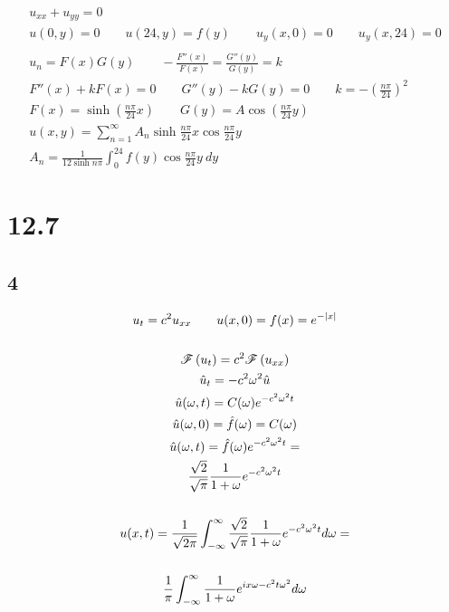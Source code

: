 \begin{gather*}
	u_{xx} + u_{yy} = 0
	\\
	u(0, y) = 0
	\qquad
	u(24, y) = f(y)
	\qquad
	u_y(x, 0) = 0
	\qquad
	u_y(x, 24) = 0
	\\
	\\
	u_n = F(x) G(y)
	\qquad
	-\frac{F''(x)}{F(x)} = \frac{G''(y)}{G(y)} = k
	\\
	F''(x) + k F(x) = 0
	\qquad
	G''(y) - k G(y) = 0
	\qquad
	k = -\left(
		\frac{n \pi}{24}
	\right)^2
	\\
	F(x) = \sinh{\left(\frac{n \pi}{24} x\right)}
	\qquad
	G(y) = A \cos{\left(\frac{n \pi}{24} y\right)}
	\\
	u(x, y) = \sum_{n = 1}^\infty{
		A_n \sinh{\frac{n \pi}{24} x} \cos{\frac{n \pi}{24} y}
	}
	\\
	A_n = \frac{1}{12 \sinh{n \pi}} \int_0^{24}{f(y) \cos{\frac{n \pi}{24} y}\ dy}
\end{gather*}


\section*{12.7}

\subsection*{4}


\begin{gather*}
	u_t = c^2 u_{xx}
	\qquad
	u(x, 0) = f(x) = e^{-|x|}
	\\
	\\
	\mathscr{F}\left( u_t \right) = c^2 \mathscr{F}\left( u_{xx} \right)
	\\
	\hat u_t = -c^2 \omega^2 \hat u
	\\
	\hat u (\omega, t) = C(\omega) e^{-c^2 \omega^2 t}
	\\
	\hat u (\omega, 0) = \hat f(\omega) = C(\omega)
	\\
	\hat u (\omega, t) = \hat f(\omega) e^{-c^2 \omega^2 t}
	=
	\\
	\frac{\sqrt{2}}{\sqrt{\pi}} \frac{1}{1 + \omega} e^{-c^2 \omega^2 t}
	\\
	\\
	u(x, t) = \frac{1}{\sqrt{2 \pi}} \int_{-\infty}^\infty{
		\frac{\sqrt{2}}{\sqrt{\pi}} \frac{1}{1 + \omega} e^{-c^2 \omega^2 t} d\omega
	}
	=
	\\
	\\
	\frac{1}{\pi} \int_{-\infty}^\infty{
		\frac{1}{1 + \omega} e^{i x \omega - c^2 t \omega^2} d\omega
	}
\end{gather*}


